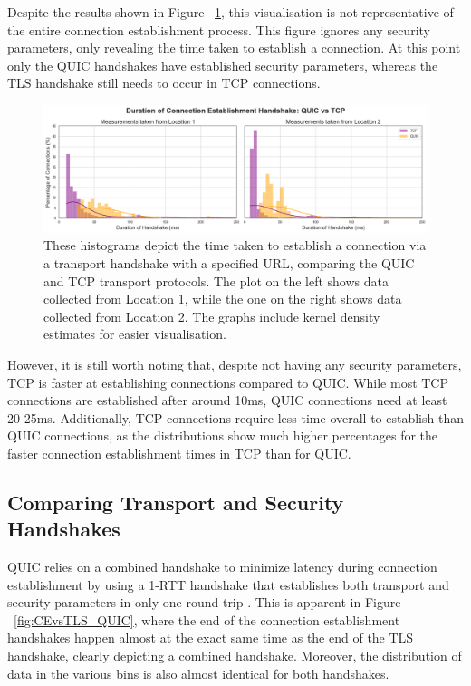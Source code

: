 \documentclass{l4proj}
\begin{document}
Despite the results shown in Figure ~\ref{fig:handshakeDuration}, this visualisation is not representative of the entire connection establishment process. This figure ignores any security parameters, only revealing the time taken to establish a connection. At this point only the QUIC handshakes have established security parameters, whereas the TLS handshake still needs to occur in TCP connections.\\

\begin{figure}[hbtp]
    \centering
    \includegraphics[width=1\linewidth]{images/connectionEstablishment.png}
    \caption{These histograms depict the time taken to establish a connection via a transport handshake with a specified URL, comparing the QUIC and TCP transport protocols. The plot on the left shows data collected from Location 1, while the one on the right shows data collected from Location 2. The graphs include kernel density estimates for easier visualisation.}
    \label{fig:handshakeDuration}
\end{figure}

However, it is still worth noting that, despite not having any security parameters, TCP is faster at establishing connections compared to QUIC. While most TCP connections are established after around 10ms, QUIC connections need at least 20-25ms. Additionally, TCP connections require less time overall to establish than QUIC connections, as the distributions show much higher percentages for the faster connection establishment times in TCP than for QUIC.


\subsection{Comparing Transport and Security Handshakes}


QUIC relies on a combined handshake to minimize latency during connection establishment by using a 1-RTT handshake that establishes both transport and security parameters in only one round trip \citep{Lang2017, Thom2020}. This is apparent in Figure ~\ref{fig:CEvsTLS_QUIC}, where the end of the connection establishment handshakes happen almost at the exact same time as the end of the TLS handshake, clearly depicting a combined handshake. Moreover, the distribution of data in the various bins is also almost identical for both handshakes.
\end{document}
